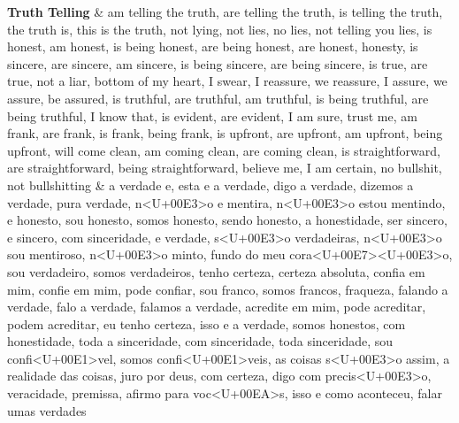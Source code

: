 \documentclass[smallextended]{svjour3}       %
\begin{document}
\begin{landscape}
\begin{longtabu}
\endfoot
\bottomrule
\endlastfoot
\textbf{Truth Telling} & am telling the truth, are telling the truth, is telling the truth, the truth is, this is the truth, not lying, not lies, no lies, not telling you lies, is honest, am honest, is being honest, are being honest, are honest, honesty, is sincere, are sincere, am sincere, is being sincere, are being sincere, is true, are true, not a liar, bottom of my heart, I swear, I reassure, we reassure, I assure, we assure, be assured, is truthful, are truthful, am truthful, is being truthful, are being truthful, I know that, is evident, are evident, I am sure, trust me, am frank, are frank, is frank, being frank, is upfront, are upfront, am upfront, being upfront, will come clean, am coming clean, are coming clean, is straightforward, are straightforward, being straightforward, believe me, I am certain, no bullshit, not bullshitting & a verdade e, esta e a verdade, digo a verdade, dizemos a verdade, pura verdade, n<U+00E3>o e mentira, n<U+00E3>o estou mentindo, e honesto, sou honesto, somos honesto, sendo honesto, a honestidade, ser sincero, e sincero, com sinceridade, e verdade, s<U+00E3>o verdadeiras, n<U+00E3>o sou mentiroso, n<U+00E3>o minto, fundo do meu cora<U+00E7><U+00E3>o, sou verdadeiro, somos verdadeiros, tenho certeza, certeza absoluta, confia em mim, confie em mim, pode confiar, sou franco, somos francos, fraqueza, falando a verdade, falo a verdade, falamos a verdade, acredite em mim, pode acreditar, podem acreditar, eu tenho certeza, isso e a verdade, somos honestos, com honestidade, toda a sinceridade, com sinceridade, toda sinceridade, sou confi<U+00E1>vel, somos confi<U+00E1>veis, as coisas s<U+00E3>o assim, a realidade das coisas, juro por deus, com certeza, digo com precis<U+00E3>o, veracidade, premissa, afirmo para voc<U+00EA>s, isso e como aconteceu, falar umas verdades\\

\end{longtabu}
\end{landscape}
\end{document}
